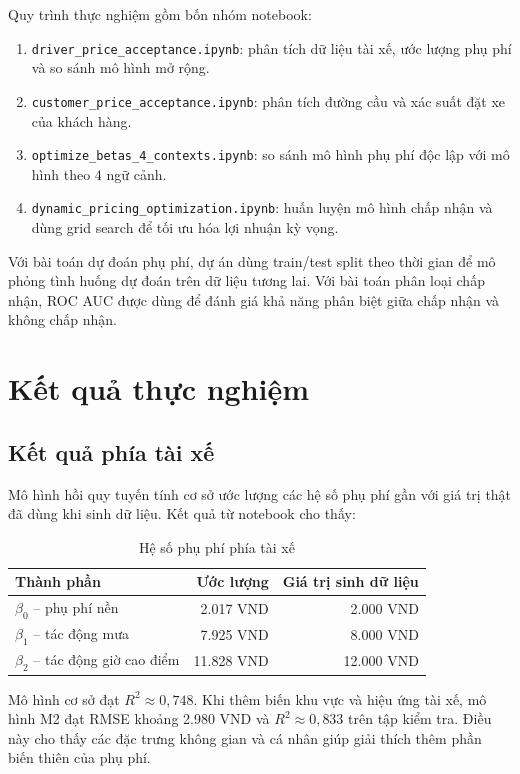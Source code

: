 \documentclass[12pt,a4paper]{report}
\begin{document}
Quy trình thực nghiệm gồm bốn nhóm notebook:

\begin{enumerate}
    \item \texttt{driver\_price\_acceptance.ipynb}: phân tích dữ liệu tài xế, ước lượng phụ phí và so sánh mô hình mở rộng.
    \item \texttt{customer\_price\_acceptance.ipynb}: phân tích đường cầu và xác suất đặt xe của khách hàng.
    \item \texttt{optimize\_betas\_4\_contexts.ipynb}: so sánh mô hình phụ phí độc lập với mô hình theo 4 ngữ cảnh.
    \item \texttt{dynamic\_pricing\_optimization.ipynb}: huấn luyện mô hình chấp nhận và dùng grid search để tối ưu hóa lợi nhuận kỳ vọng.
\end{enumerate}

Với bài toán dự đoán phụ phí, dự án dùng train/test split theo thời gian để mô phỏng tình huống dự đoán trên dữ liệu tương lai. Với bài toán phân loại chấp nhận, ROC AUC được dùng để đánh giá khả năng phân biệt giữa chấp nhận và không chấp nhận.

\chapter{Kết quả thực nghiệm}

\section{Kết quả phía tài xế}

Mô hình hồi quy tuyến tính cơ sở ước lượng các hệ số phụ phí gần với giá trị thật đã dùng khi sinh dữ liệu. Kết quả từ notebook cho thấy:

\begin{table}[H]
\centering
\caption{Hệ số phụ phí phía tài xế}
\begin{tabular}{lrr}
\toprule
\textbf{Thành phần} & \textbf{Ước lượng} & \textbf{Giá trị sinh dữ liệu} \\
\midrule
$\beta_0$ -- phụ phí nền & 2.017 VND & 2.000 VND \\
$\beta_1$ -- tác động mưa & 7.925 VND & 8.000 VND \\
$\beta_2$ -- tác động giờ cao điểm & 11.828 VND & 12.000 VND \\
\bottomrule
\end{tabular}
\end{table}

Mô hình cơ sở đạt $R^2 \approx 0,748$. Khi thêm biến khu vực và hiệu ứng tài xế, mô hình M2 đạt RMSE khoảng 2.980 VND và $R^2 \approx 0,833$ trên tập kiểm tra. Điều này cho thấy các đặc trưng không gian và cá nhân giúp giải thích thêm phần biến thiên của phụ phí.
\end{document}
